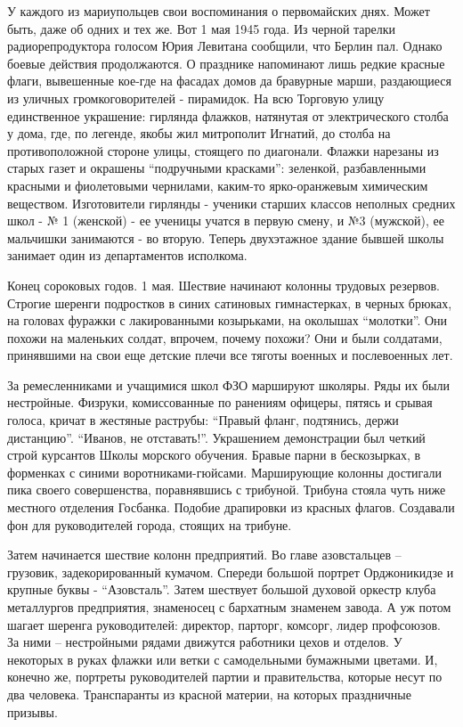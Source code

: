 
У каждого из мариупольцев свои воспоминания о первомайских днях. Может быть,
даже об одних и тех же. Вот 1 мая 1945 года. Из черной тарелки
радиорепродуктора голосом Юрия Левитана сообщили, что Берлин пал. Однако
боевые действия продолжаются. О празднике напоминают лишь редкие красные флаги,
вывешенные кое-где на фасадах домов да бравурные марши, раздающиеся из уличных
громкогово­рителей - пирамидок. На всю Торговую улицу единственное украшение:
гирлянда флажков, натянутая от электрического столба у дома, где, по легенде,
якобы жил митрополит Игнатий, до столба на противоположной стороне улицы,
стоящего по диагонали. Флажки нарезаны из старых газет и окрашены \enquote{подручными
красками}: зеленкой, разбавленными красными и фиолетовыми чернилами, каким-то
ярко-оран­жевым химическим веществом. Изготовители гирлянды - ученики старших
классов неполных средних школ - № 1 (женской) - ее ученицы учатся в первую
смену, и №3 (мужской), ее мальчишки занимаются - во вторую. Теперь двухэтажное
здание бывшей школы занимает один из департаментов исполкома.


Конец сороковых годов. 1 мая. Шествие начинают колонны трудовых резервов.
Строгие шеренги подростков в синих сатиновых гимнастерках, в черных брюках, на
головах фуражки с лакированными козырьками, на околышах \enquote{молотки}. Они похожи
на маленьких солдат, впрочем, почему похожи? Они и были солдатами, принявшими
на свои еще детские плечи все тяготы военных и послевоенных лет. 


За ремесленниками и учащимися школ ФЗО маршируют школяры. Ряды их были
нестройные. Физруки, комиссованные по ранениям офицеры, пятясь и срывая голоса,
кричат в жестяные раструбы: \enquote{Правый фланг, подтянись, держи дистанцию}.
\enquote{Иванов, не отставать!}. Украшением демонстрации был четкий строй курсантов
Школы морского обучения.  Бравые парни в бескозырках, в форменках с синими
воротниками-гюйсами. Марширующие колонны достигали пика своего совер­шенства,
поравнявшись с трибуной. Трибуна стояла чуть ниже местного отделения Госбанка.
Подобие драпировки из красных флагов.  Создавали фон для руководителей города,
стоящих на трибуне.

Затем начинается шествие колонн предприятий.  Во главе азовстальцев – грузовик,
задекорированный кумачом.  Спереди большой портрет Орджоникидзе и крупные буквы
- \enquote{Азовсталь}.  Затем шествует большой духовой оркестр клуба металлургов
предприятия, знаменосец с бархатным знаменем завода. А уж потом шагает шеренга
руководителей: директор, парторг, комсорг, лидер профсоюзов. За ними –
нестройными рядами движутся работники цехов и отделов. У некоторых в руках
флажки или ветки с самодельными бумажными цветами. И, конечно же, портреты
руководителей партии и правительства, которые несут по два человека.
Транспаранты из красной материи, на которых праздничные призывы.

